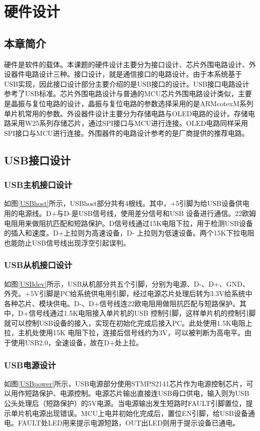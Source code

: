 
\chapter{硬件设计}
\section{本章简介}
硬件是软件的载体。本课题的硬件设计主要分为接口设计、芯片外围电路设计、外设器件电路设计三种。接口设计，就是通信接口的电路设计。由于本系统基于USB实现，因此接口设计部分主要介绍的是USB接口的设计。USB接口电路设计参考了USB标准。芯片外围电路设计与普通的MCU芯片外围电路设计类似，主要是晶振与复位电路的设计，晶振与复位电路的参数选择采用的是ARMcotexM系列单片机常用的参数。外设器件设计主要分为存储电路与OLED电路的设计。存储电路采用W25系列存储芯片，通过SPI接口与MCU进行连接。OLED电路同样采用SPI接口与MCU进行连接。外围器件的电路设计参考的是厂商提供的推荐电路。
\section{USB接口设计}
\subsection{USB主机接口设计}
如图\ref{USBhost}所示，USBhost部分共有4根线。其中，+5引脚为给USB设备供电用的电源线。D+与D-是USB信号线，使用差分信号和USB 设备进行通信。22欧姆电阻用来做阻抗匹配和短路保护。D信号线通过15K电阻下拉，用于检测USB设备的插入和速度。D+上拉则为高速设备，D- 上拉则为低速设备。两个15K下拉电阻也能防止USB信号线出现浮空引起误判。
　　
\subsection{USB从机接口设计}
如图\ref{USBdev}所示，USB从机部分共五个引脚，分别为电源、D-、D+、GND、外壳。+5V引脚是PC给系统供电用引脚，经过电源芯片处理后转为3.3V给系统中各种芯片、模块供电。D-、D+信号线连22欧电阻用做阻抗匹配与短路保护。其中，D+信号线通过1.5K电阻接入单片机的USB 控制引脚，这样单片机的控制引脚就可以控制USB设备的接入，实现在初始化完成后接入PC。此处使用1.5K电阻上拉，主机处使用15K 电阻下拉，连接后信号线约为3V，可以被判断为高电平。由于使用USB2.0，全速设备，故在D+处上拉。

\subsection{USB电源设计}
如图\ref{USBpower}所示，USB电源部分使用STMPS2141芯片作为电源控制芯片，可以用作短路保护、电源控制。电源芯片输出直接连USB母口供电，输入则为USB公头处理后（短路保护）的5V电源。当电源输出发生短路时FAULT引脚置位，提示单片机电源出现错误。MCU上电并初始化完成后，置位EN引脚，给USB设备通电。FAULT处LED用来提示电源短路，OUT出LED则用于提示设备已通电。

